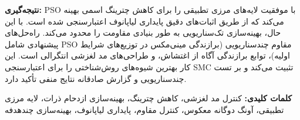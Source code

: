 \begin{persian}
\vspace{0.5cm}

\noindent
\textbf{نتیجه‌گیری:}
PSO با موفقیت لایه‌های مرزی تطبیقی را برای کاهش چترینگ اسمی بهینه می‌کند که از طریق اثبات‌های دقیق پایداری لیاپانوف اعتبارسنجی شده است. با این حال، بهینه‌سازی تک‌سناریویی به طور بنیادی مقاومت را محدود می‌کند. راه‌حل‌های پیشنهادی شامل PSO مقاوم چندسناریویی (برازندگی مینی‌مکس در توزیع‌های شرایط اولیه)، توابع برازندگی آگاه از اغتشاش، و طراحی‌های مد لغزشی انتگرالی است. این کار بهترین شیوه‌های روش‌شناختی را برای اعتبارسنجی SMC تثبیت می‌کند و بر تست چندسناریویی و گزارش صادقانه نتایج منفی تأکید دارد.

\vspace{0.5cm}

\noindent
\textbf{کلمات کلیدی:}
کنترل مد لغزشی، کاهش چترینگ، بهینه‌سازی ازدحام ذرات، لایه مرزی تطبیقی، آونگ دوگانه معکوس، کنترل مقاوم، پایداری لیاپانوف، بهینه‌سازی چندهدفه

\end{persian}

\clearpage
